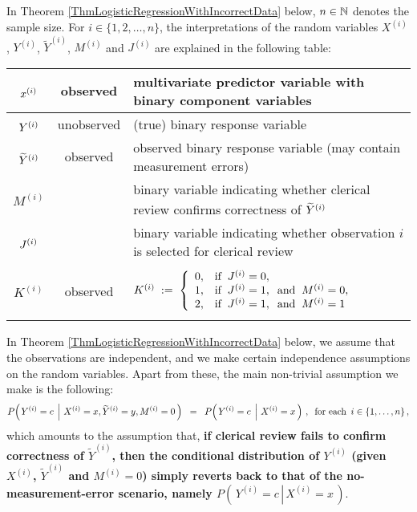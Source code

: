 \vskip 0.3cm
\noindent
In Theorem \ref{ThmLogisticRegressionWithIncorrectData} below,
$n \in \mathbb{N}$ denotes the sample size.
For $i \in \{1,2,\ldots,n\}$, the interpretations of the random variables
$X^{(i)}$, $Y^{(i)}$, $\widetilde{Y}^{(i)}$, $M^{(i)}$ and $J^{(i)}$
are explained in the following table:
\begin{center}
\begin{tabular}{|c|c|l|}
\hline
$\overset{{\color{white}.}}{x^{(i)}}$ & observed & multivariate predictor variable with binary component variables
\\ \hline
$\overset{{\color{white}.}}{Y^{(i)}}$ & unobserved & (true) binary response variable
\\ \hline
$\overset{{\color{white}.}}{\widetilde{Y}^{(i)}}$ & observed & observed binary response variable (may contain measurement errors)
\\ \hline
$M^{(i)}$ & & binary variable indicating whether clerical review confirms correctness of $\overset{{\color{white}.}}{\widetilde{Y}^{(i)}}$
\\ \hline
$\overset{{\color{white}.}}{J^{(i)}}$ & & binary variable indicating whether observation $i$ is selected for clerical review
\\ \hline
&& \\
$K^{(i)}$ & observed & $K^{(i)} \;:=\;
	\left\{\begin{array}{cl}
		0, & \textnormal{if}\;\; J^{(i)} = 0,
		\\
		1, & \textnormal{if}\;\; J^{(i)} = 1, \;\;\textnormal{and}\;\; M^{(i)} = 0,
		\\
		2, & \textnormal{if}\;\; J^{(i)} = 1, \;\;\textnormal{and}\;\; M^{(i)} = 1
	\end{array}\right.$
\\
&& \\
\hline
\end{tabular}
\end{center}

\vskip0.5cm
\begin{remark}
\mbox{}\vskip 0.1cm\noindent
In Theorem \ref{ThmLogisticRegressionWithIncorrectData} below,
we assume that the observations are independent, and
we make certain independence assumptions on the random variables.
Apart from these, the main non-trivial assumption we make is the following:
\begin{equation*}
P\!\left(\left.Y^{(i)} = c\,\;\right\vert\,X^{(i)}=x,\widetilde{Y}^{(i)}=y,M^{(i)}=0\,\right)
\;\; = \;\;
P\!\left(\left.Y^{(i)} = c\,\;\right\vert\,X^{(i)}=x\,\right)\,,
\;\;
\textnormal{for each \,$i\in\{1,\ldots,n\}$}\,,
\end{equation*}
which amounts to the assumption that,
\textbf{\color{red}if clerical review fails to confirm correctness of $\widetilde{Y}^{(i)}$,
then the conditional distribution of $Y^{(i)}$ (given $X^{(i)}$, $\widetilde{Y}^{(i)}$ and $M^{(i)}=0$)
simply reverts back to that of the no-measurement-error scenario,
namely $P\!\left(\,\left.Y^{(i)}=c\,\right\vert\,X^{(i)}=x\,\right)$}.
\end{remark}

